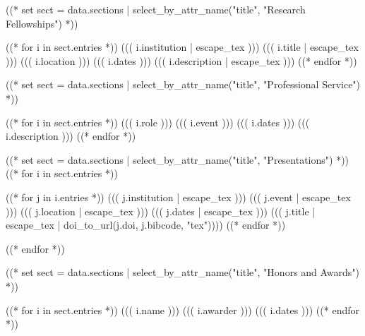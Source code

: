\documentclass[10pt, letterpaper]{awesome-cv}
\begin{document}
((* set sect = data.sections | select_by_attr_name("title", "Research Fellowships") *))
\begin{cventries}
((* for i in sect.entries *))
\cventry
  {((( i.institution | escape_tex )))}
  {((( i.title | escape_tex )))}
  {((( i.location )))}
  {((( i.dates )))}
  {((( i.description | escape_tex )))}
((* endfor *))
\end{cventries}

((* set sect = data.sections | select_by_attr_name("title", "Professional Service") *))
\begin{cventries}
((* for i in sect.entries *))
\cventry
  {((( i.role )))}
  {((( i.event )))}
  {}
  {((( i.dates )))}
  {((( i.description )))}
((* endfor *))
\end{cventries}

((* set sect = data.sections | select_by_attr_name("title", "Presentations") *))
((* for i in sect.entries *))
\begin{cventries}
((* for j in i.entries *))
\cventry
  {((( j.institution | escape_tex )))}
  {((( j.event | escape_tex )))}
  {((( j.location | escape_tex )))}
  {((( j.dates | escape_tex )))}
  {((( j.title | escape_tex | doi_to_url(j.doi, j.bibcode, "tex"))))}
((* endfor *))
\end{cventries}
((* endfor *))

((* set sect = data.sections | select_by_attr_name("title", "Honors and Awards") *))
\begin{cvhonors}
((* for i in sect.entries *))
\cvhonor
  {((( i.name )))}
  {((( i.awarder )))}
  {}
  {((( i.dates )))}
((* endfor *))
\end{cvhonors}
\end{document}
